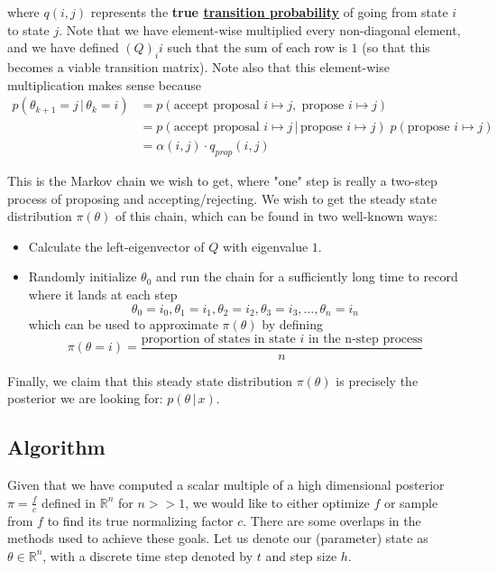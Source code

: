   where $q(i, j)$ represents the \textbf{true \hyperref[sp-def:transition-probability]{transition probability}} of going from state $i$ to state $j$. Note that we have element-wise multiplied every non-diagonal element, and we have defined $(Q)_ii$ such that the sum of each row is $1$ (so that this becomes a viable transition matrix). Note also that this element-wise multiplication makes sense because
  \begin{align*}
    p(\theta_{k+1} = j\,|\, \theta_k = i) & = p(\text{accept proposal }i \mapsto j, \; \text{propose } i \mapsto j) \\
    & = p(\text{accept proposal }i \mapsto j\,|\, \text{propose } i \mapsto j)\; p(\text{propose } i \mapsto j) \\
    & = \alpha(i, j) \cdot q_{prop} (i, j)
  \end{align*}

  This is the Markov chain we wish to get, where "one" step is really a two-step process of proposing and accepting/rejecting. We wish to get the steady state distribution $\pi(\theta)$ of this chain, which can be found in two well-known ways:
  \begin{itemize}
    \item Calculate the left-eigenvector of $Q$ with eigenvalue $1$.
    \item Randomly initialize $\theta_0$ and run the chain for a sufficiently long time to record where it lands at each step
    \begin{equation}
      \theta_0 = i_0, \theta_1 = i_1, \theta_2 = i_2, \theta_3 = i_3, \ldots, \theta_n = i_n
    \end{equation}
    which can be used to approximate $\pi(\theta)$ by defining
    \begin{equation}
      \pi(\theta = i) = \frac{\text{proportion of states in state } i \text{ in the n-step process}}{n}
    \end{equation}
  \end{itemize}

  Finally, we claim that this steady state distribution $\pi(\theta)$ is precisely the posterior we are looking for: $p(\theta\,|\,x)$.

\subsection{Algorithm}

  Given that we have computed a scalar multiple of a high dimensional posterior $\pi = \frac{f}{c}$ defined in $\mathbb{R}^n$ for $n >> 1$, we would like to either optimize $f$ or sample from $f$ to find its true normalizing factor $c$. There are some overlaps in the methods used to achieve these goals. Let us denote our (parameter) state as $\theta \in \mathbb{R}^n$, with a discrete time step denoted by $t$ and step size $h$. 

